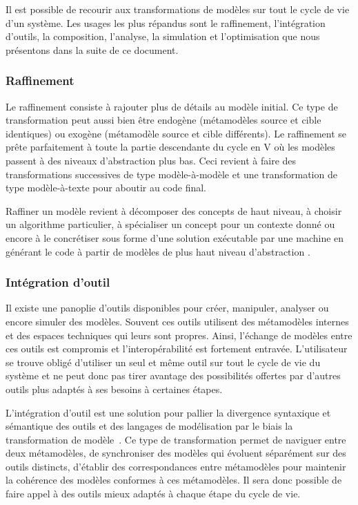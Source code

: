 Il est possible de recourir aux transformations de modèles sur tout le cycle de 
vie d'un système. Les usages les plus répandus sont le raffinement, 
l'intégration d'outils, la composition, l'analyse, la simulation et 
l'optimisation que nous présentons dans la suite de ce document. 


\subsubsection{Raffinement}

Le raffinement consiste à rajouter plus de détails au modèle initial. Ce type de 
transformation peut aussi bien être endogène (métamodèles source et cible 
identiques) ou exogène (métamodèle source et cible différents). Le raffinement se 
prête parfaitement à toute la partie descendante du cycle en V où les modèles 
passent à des niveaux d'abstraction plus bas. Ceci revient à faire des 
transformations successives de type modèle-à-modèle et une transformation de 
type modèle-à-texte pour aboutir au code final.

Raffiner un modèle revient à décomposer des concepts de haut niveau, à choisir 
un algorithme particulier, à spécialiser un concept pour un contexte donné ou 
encore à le concrétiser sous forme d'une solution exécutable par une machine en 
générant le code à partir de modèles de plus haut niveau d'abstraction 
\cite{czarnecki2000intentional}. 

\subsubsection{Intégration d'outil}

Il existe une panoplie d'outils disponibles pour créer, manipuler, analyser ou 
encore simuler des modèles. Souvent ces outils utilisent des métamodèles 
internes et des espaces techniques qui leurs sont propres. Ainsi, l'échange de 
modèles entre ces outils est compromis et l'interopérabilité est fortement 
entravée. L'utilisateur se trouve obligé d'utiliser un seul et même outil sur 
tout le cycle de vie du système et ne peut donc pas tirer avantage des 
possibilités offertes par d'autres outils plus adaptés à ses besoins à certaines 
étapes.

L'intégration d'outil est une solution pour pallier la divergence syntaxique et 
sémantique des outils et des langages de modélisation par le biais la 
transformation de modèle~\cite{tratt2005model}. Ce type de transformation permet 
de naviguer entre deux métamodèles, de synchroniser des modèles qui évoluent 
séparément sur des outils distincts, d'établir des correspondances entre métamodèles pour 
maintenir la cohérence des modèles conformes à ces métamodèles. Il sera donc 
possible de faire appel à des outils mieux adaptés à chaque étape du cycle de 
vie.

